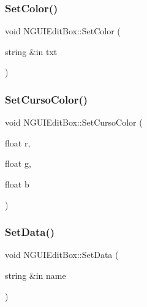 \hypertarget{class_n_g_u_i_edit_box_a1134fda718dcb7e9f3e0116a3ac9707b}{}\label{class_n_g_u_i_edit_box_a1134fda718dcb7e9f3e0116a3ac9707b} 
\subsubsection{\texorpdfstring{Set\+Color()}{SetColor()}\hspace{0.1cm}{\footnotesize\ttfamily [2/2]}}
{\footnotesize\ttfamily void N\+G\+U\+I\+Edit\+Box\+::\+Set\+Color (\begin{DoxyParamCaption}\item[{string \&in}]{txt }\end{DoxyParamCaption})}

\hypertarget{class_n_g_u_i_edit_box_a612e8b7dd6ae2bf019e7dc39a5b0b186}{}\label{class_n_g_u_i_edit_box_a612e8b7dd6ae2bf019e7dc39a5b0b186} 
\subsubsection{\texorpdfstring{Set\+Curso\+Color()}{SetCursoColor()}}
{\footnotesize\ttfamily void N\+G\+U\+I\+Edit\+Box\+::\+Set\+Curso\+Color (\begin{DoxyParamCaption}\item[{float}]{r,  }\item[{float}]{g,  }\item[{float}]{b }\end{DoxyParamCaption})}

\hypertarget{class_n_g_u_i_edit_box_a35bcadb3902d18d3ea2450bd76e92aa8}{}\label{class_n_g_u_i_edit_box_a35bcadb3902d18d3ea2450bd76e92aa8} 
\subsubsection{\texorpdfstring{Set\+Data()}{SetData()}}
{\footnotesize\ttfamily void N\+G\+U\+I\+Edit\+Box\+::\+Set\+Data (\begin{DoxyParamCaption}\item[{string \&in}]{name }\end{DoxyParamCaption})}

